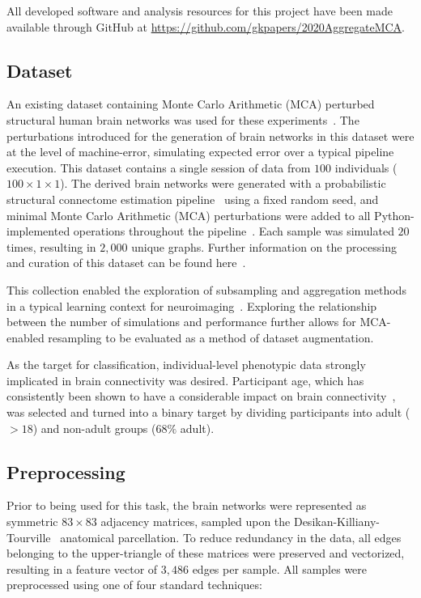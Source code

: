 \documentclass[10pt]{SelfArx} %
\begin{document}
All developed software and analysis resources for this project have been made available through GitHub at
\url{https://github.com/gkpapers/2020AggregateMCA}.

\subsection*{Dataset}

An existing dataset containing Monte Carlo Arithmetic (MCA) perturbed structural human brain networks was used for
these experiments~\cite{Kiar2020-yz}. The perturbations introduced for the generation of brain networks in this dataset
were at the level of machine-error, simulating expected error over a typical pipeline execution. This dataset contains
a single session of data from $100$ individuals ($100\times 1 \times1$). The derived brain networks were generated with
a probabilistic structural connectome estimation pipeline~\cite{Garyfallidis2014-ql} using a fixed random seed, and minimal
Monte Carlo Arithmetic (MCA) perturbations were added to all Python-implemented operations throughout the
pipeline~\cite{Denis2016-wo,Parker1997-qq}. Each sample was simulated $20$ times, resulting in $2,000$ unique graphs.
Further information on the processing and curation of this dataset can be found here~\cite{Kiar2020-kz}.

This collection enabled the exploration of subsampling and aggregation methods in a typical learning context for
neuroimaging~\cite{Dimitriadis2017-pd,Buchanan2014-pm}. Exploring the relationship between the number of simulations
and performance further allows for MCA-enabled resampling to be evaluated as a method of dataset augmentation.

As the target for classification, individual-level phenotypic data strongly implicated in brain connectivity was
desired. Participant age, which has consistently been shown to have a considerable impact on brain
connectivity~\cite{Meier2012-ve,Wu2012-uc,Bookheimer2019-ti,Zhao2015-rm}, was selected and turned into a binary target
by dividing participants into adult ($>18$) and non-adult groups ($68\%$ adult). 

\subsection*{Preprocessing}
Prior to being used for this task, the brain networks were represented as symmetric $83 \times 83$ adjacency
matrices, sampled upon the Desikan-Killiany-Tourville~\cite{Klein2012-vi} anatomical parcellation. To reduce redundancy
in the data, all edges belonging to the upper-triangle of these matrices were preserved and vectorized, resulting in a
feature vector of $3,486$ edges per sample. All samples were preprocessed using one of four standard techniques:
\end{document}

